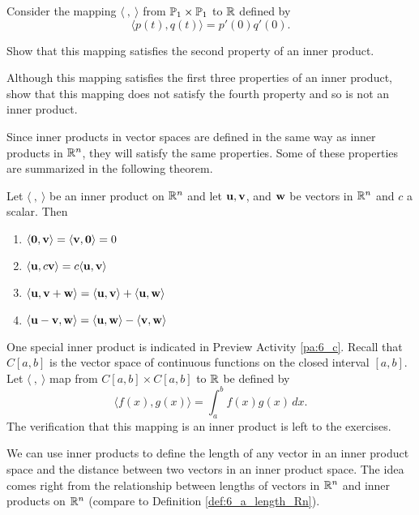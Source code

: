  \begin{activity} Consider the mapping $\langle \ , \ \rangle $ from $\mathbb{P}_1 \times \mathbb{P}_1$ to $\mathbb{R}$ defined by 
\[\langle p(t), q(t) \rangle = p'(0)q'(0).\]
\ba
\item Show that this mapping satisfies the second property of an inner product.

\item Although this mapping satisfies the first three properties of an inner product, show that this mapping does not satisfy the fourth property and so is not an inner product. 
\ea

\end{activity}


Since inner products in vector spaces are defined in the same way as inner products in $\mathbb{R}^n$, they will satisfy the same properties. Some of these properties are summarized in the following theorem.

\begin{theorem} \label{thm:6_c_inner_product_properties} Let $\langle \ , \ \rangle$ be an inner product on $\mathbb{R}^n$ and let $\mathbf{u}, \mathbf{v}$, and $\mathbf{w}$ be vectors in $\mathbb{R}^n$ and $c$ a scalar. Then
\begin{enumerate}
	\item $\langle \mathbf{0} , \mathbf{v} \rangle = \langle \mathbf{v} , \mathbf{0} \rangle = 0$
	\item $\langle \mathbf{u} , c\mathbf{v} \rangle = c\langle \mathbf{u} , \mathbf{v} \rangle$
	\item $\langle \mathbf{u} , \mathbf{v}+\mathbf{w} \rangle = \langle \mathbf{u} , \mathbf{v} \rangle + \langle \mathbf{u} , \mathbf{w} \rangle$
\item $\langle \mathbf{u} - \mathbf{v}, \mathbf{w} \rangle = \langle \mathbf{u} , \mathbf{w} \rangle - \langle \mathbf{v} , \mathbf{w} \rangle$
\end{enumerate}
\end{theorem}

One special inner product is indicated in Preview Activity \ref{pa:6_c}. Recall that $C[a,b]$ is the vector space of continuous functions on the closed interval $[a,b]$. Let $\langle \ ,  \ \rangle$ map from $C[a,b] \times C[a,b]$ to $\mathbb{R}$ be defined by 
\[\langle f(x), g(x) \rangle = \int_a^b f(x)g(x) \, dx.\]
The verification that this mapping is an inner product is left to the exercises. 


We can use inner products to define the length of any vector in an inner product space and the distance between two vectors in an inner product space. The idea comes right from the relationship between lengths of vectors in $\mathbb{R}^n$ and inner products on $\mathbb{R}^n$ (compare to Definition \ref{def:6_a_length_Rn}). 

